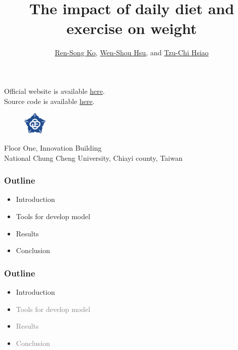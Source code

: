 \documentclass[fleqn]{beamer}
\title{
The impact of daily diet and exercise on weight
}
\author{
    \href{mailto: korenson@cs.ccu.edu.tw}{Ren-Song Ko}, \href{mailto: wisleyqqq0630@alum.ccu.edu.tw}{Wen-Shou Hsu}, and  \href{mailto: stchi111u@cs.ccu.edu.tw}{Tzu-Chi Hsiao}
}
\date{}
\begin{document}
\begin{frame}
  \titlepage
  \begin{center}
  Official website is available \href{https://www2.cs.ccu.edu.tw/~stchi111u/project/gradp.html}{here}. \\
  Source code is available \href{https://www2.cs.ccu.edu.tw/~stchi111u/project/source/TIDEW.zip}{here}.
\end{center}
\begin{figure}[h]
    \centering
\includegraphics[width=0.10\textwidth]{logo.png}
\end{figure}
\begin{center}
  Floor One, Innovation Building \\
  National Chung Cheng University, Chiayi county, Taiwan
\end{center}
\end{frame}
\begin{frame}
\frametitle{Outline}
\begin{itemize}
        \item Introduction
        \vspace{0.15 cm}
        \item Tools for develop model
        \vspace{0.15 cm}
        \item Results
        \vspace{0.15 cm}
        \item Conclusion
        \vspace{0.15 cm}
\end{itemize}
\end{frame}
\begin{frame}
\frametitle{Outline}
\begin{itemize}
        \item Introduction
        \vspace{0.15 cm}
        \item \textcolor{gray}{Tools for develop model}
        \vspace{0.15 cm}
        \item \textcolor{gray}{Results}
        \vspace{0.15 cm}
        \item \textcolor{gray}{Conclusion}
        \vspace{0.15 cm}
\end{itemize}
\end{frame}
\end{document}
